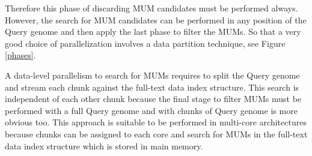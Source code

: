 \documentclass{acm_proc_article-sp}
\begin{document}
Therefore this phase of discarding MUM candidates must be performed always. However, the search for MUM candidates can be performed in any position of the Query genome and then apply the last phase to filter the MUMs. So that a very good choice of parallelization involves a data partition technique, see Figure \ref{phases}.
  
    A data-level parallelism to search for MUMs requires to split the Query genome and stream each chunk against the full-text data index structure. This search is independent of each other chunk because the final stage to filter MUMs must be performed with a full Query genome and with chunks of Query genome is more obvious too. This approach is suitable to be performed in multi-core architectures because chunks can be assigned to each core and search for MUMs in the full-text data index structure which is stored in main memory.
    
\end{document}

